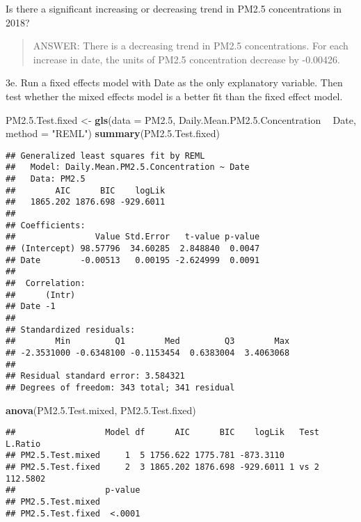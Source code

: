 \documentclass[]{article}
\newenvironment{Shaded}{\begin{snugshade}}{\end{snugshade}}
\newcommand{\KeywordTok}[1]{\textcolor[rgb]{0.13,0.29,0.53}{\textbf{#1}}}
\newcommand{\DataTypeTok}[1]{\textcolor[rgb]{0.13,0.29,0.53}{#1}}
\newcommand{\DecValTok}[1]{\textcolor[rgb]{0.00,0.00,0.81}{#1}}
\newcommand{\FloatTok}[1]{\textcolor[rgb]{0.00,0.00,0.81}{#1}}
\newcommand{\StringTok}[1]{\textcolor[rgb]{0.31,0.60,0.02}{#1}}
\newcommand{\OperatorTok}[1]{\textcolor[rgb]{0.81,0.36,0.00}{\textbf{#1}}}
\newcommand{\NormalTok}[1]{#1}
\begin{document}
Is there a significant increasing or decreasing trend in PM2.5
concentrations in 2018?

\begin{quote}
ANSWER: There is a decreasing trend in PM2.5 concentrations. For each
increase in date, the units of PM2.5 concentration decrease by -0.00426.
\end{quote}

3e. Run a fixed effects model with Date as the only explanatory
variable. Then test whether the mixed effects model is a better fit than
the fixed effect model.

\begin{Shaded}
\begin{Highlighting}[]
\NormalTok{PM2.}\FloatTok{5.}\NormalTok{Test.fixed <-}\StringTok{ }\KeywordTok{gls}\NormalTok{(}\DataTypeTok{data =}\NormalTok{ PM2.}\DecValTok{5}\NormalTok{,}
\NormalTok{                       Daily.Mean.PM2.}\FloatTok{5.}\NormalTok{Concentration }\OperatorTok{~}\StringTok{ }\NormalTok{Date, }
                      \DataTypeTok{method =} \StringTok{"REML"}\NormalTok{)}
\KeywordTok{summary}\NormalTok{(PM2.}\FloatTok{5.}\NormalTok{Test.fixed)}
\end{Highlighting}
\end{Shaded}

\begin{verbatim}
## Generalized least squares fit by REML
##   Model: Daily.Mean.PM2.5.Concentration ~ Date 
##   Data: PM2.5 
##        AIC      BIC    logLik
##   1865.202 1876.698 -929.6011
## 
## Coefficients:
##                Value Std.Error   t-value p-value
## (Intercept) 98.57796  34.60285  2.848840  0.0047
## Date        -0.00513   0.00195 -2.624999  0.0091
## 
##  Correlation: 
##      (Intr)
## Date -1    
## 
## Standardized residuals:
##        Min         Q1        Med         Q3        Max 
## -2.3531000 -0.6348100 -0.1153454  0.6383004  3.4063068 
## 
## Residual standard error: 3.584321 
## Degrees of freedom: 343 total; 341 residual
\end{verbatim}

\begin{Shaded}
\begin{Highlighting}[]
\KeywordTok{anova}\NormalTok{(PM2.}\FloatTok{5.}\NormalTok{Test.mixed, PM2.}\FloatTok{5.}\NormalTok{Test.fixed)}
\end{Highlighting}
\end{Shaded}

\begin{verbatim}
##                  Model df      AIC      BIC    logLik   Test  L.Ratio
## PM2.5.Test.mixed     1  5 1756.622 1775.781 -873.3110                
## PM2.5.Test.fixed     2  3 1865.202 1876.698 -929.6011 1 vs 2 112.5802
##                  p-value
## PM2.5.Test.mixed        
## PM2.5.Test.fixed  <.0001
\end{verbatim}
\end{document}
